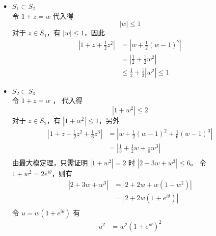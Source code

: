 \documentclass[a4paper]{article}
\begin{document}
\begin{itemize}
    \item $S_1 \subset S_2$\\
    令 $1+z=w$ 代入得
    \begin{equation}
        \left|w\right| \leq 1
    \end{equation}
    对于 $z \in S_1$，有 $|w| \leq 1$，因此
    \begin{equation}
        \begin{aligned}
            \left|1+z+\frac{1}{2} z^2\right| &= \left|w + \frac{1}{2} (w-1)^2\right| \\
            &= \left|\frac{1}{2} + \frac{1}{2} w^2\right| \\
            &\leq \frac{1}{2} + \frac{1}{2}\left|w^2\right| \leq 1
        \end{aligned}
    \end{equation}
    \item $S_2 \subset S_3$\\
    令 $1+z= w$ ， 代入得
    \begin{equation}
        \left|1+w^2\right| \leq 2
    \end{equation}
    对于 $z \in S_2$，有 $|1+w^2| \leq 1$，另外
    \begin{equation}
        \begin{aligned}
            \left|1+z+\frac{1}{2} z^2 + \frac{1}{6} z^3\right| 
            &= \left|w + \frac{1}{2} (w-1)^2 + \frac{1}{6} (w-1)^3\right| \\
            &= \left|\frac{1}{3} + \frac{1}{2} w + \frac{1}{6} w^3\right| \\
        \end{aligned}
    \end{equation}
    由最大模定理，只需证明 $|1+w^2| = 2$ 时 $|2 + 3 w + w^3| \leq 6$。
    令 $1+w^2=2e^{i\theta}$，则有
    \begin{equation}
        \begin{aligned}
            \left|2 + 3 w + w^3\right|
            &= \left|
                2 + 2 w +w(1+w^2)
            \right|\\
            &= \left|
                2 + 2 w (1+e^{i\theta})
            \right| \\
        \end{aligned}
    \end{equation}
    令 $u = w (1+e^{i\theta})$ 有
    \begin{equation}
        \begin{aligned}
            u^2 &= w^2 (1+e^{i\theta})^2\\

\end{aligned}
\end{equation}
\end{itemize}
\end{document}
